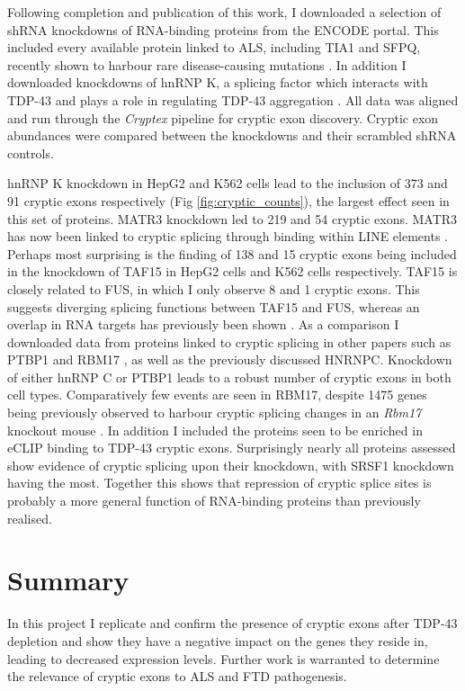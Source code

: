 Following completion and publication of this work, I downloaded a selection of shRNA knockdowns of RNA-binding proteins from the ENCODE portal. 
This included every available protein linked to ALS, including TIA1 and SFPQ, recently shown to harbour rare disease-causing mutations \citep{Mackenzie2017,Thomas-Jinu2017}.
In addition I downloaded knockdowns of hnRNP K, a splicing factor which interacts with TDP-43 \citep{Freibaum2010-hw} and plays a role in regulating TDP-43 aggregation \citep{Moujalled2015}.
All data was aligned and run through the \textit{Cryptex} pipeline for cryptic exon discovery. Cryptic exon abundances were compared between the knockdowns and their scrambled shRNA controls.

hnRNP K knockdown in HepG2 and K562 cells lead to the inclusion of 373 and 91 cryptic exons respectively (Fig \ref{fig:cryptic_counts}), the largest effect seen in this set of proteins.
MATR3 knockdown led to 219 and 54 cryptic exons. MATR3 has now been linked to cryptic splicing through binding within LINE elements \citep{Attig2018}.
Perhaps most surprising is the finding of 138 and 15 cryptic exons being included in the knockdown of TAF15 in HepG2 cells and K562 cells respectively. 
TAF15 is closely related to FUS, in which I only observe 8 and 1 cryptic exons.
This suggests diverging splicing functions between TAF15 and FUS, whereas an overlap in RNA targets has previously been shown \citep{Kapeli2016}.
As a comparison I downloaded data from proteins linked to cryptic splicing in other papers such as PTBP1 and RBM17 \citep{Ling2016, Tan2016}, as well as the previously discussed HNRNPC. 
Knockdown of either hnRNP C or PTBP1 leads to a robust number of cryptic exons in both cell types.
Comparatively few events are seen in RBM17, despite 1475 genes being previously observed to harbour cryptic splicing changes in an \textit{Rbm17} knockout mouse \citep{Tan2016}.
In addition I included the proteins seen to be enriched in eCLIP binding to TDP-43 cryptic exons.
Surprisingly nearly all proteins assessed show evidence of cryptic splicing upon their knockdown, with SRSF1 knockdown having the most.
Together this shows that repression of cryptic splice sites is probably a more general function of RNA-binding proteins than previously realised.

\section{Summary}
In this project I replicate and confirm the presence of cryptic exons after TDP-43 depletion and show they have a negative impact on the genes they reside in, leading to decreased expression levels. 
Further work is warranted to determine the relevance of cryptic exons to ALS and FTD pathogenesis.


